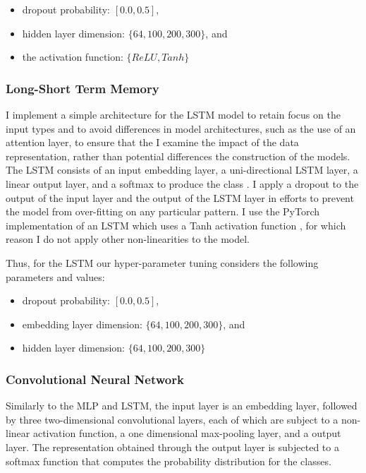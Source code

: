 \begin{itemize}  
  \item dropout probability: $[0.0, 0.5]$,  
  \item hidden layer dimension: $\{64, 100, 200, 300\}$, and  
  \item the activation function: $\{ReLU, Tanh\}$  
\end{itemize}  
  
\subsubsection{Long-Short Term Memory}  
I implement a simple architecture for the LSTM model to retain focus on the input types and to avoid differences in model architectures, such as the use of an attention layer, to ensure that the I examine the impact of the data representation, rather than potential differences the construction of the models.  
The LSTM consists of an input embedding layer, a uni-directional LSTM layer, a linear output layer, and a softmax to produce the class .  
I apply a dropout to the output of the input layer and the output of the LSTM layer in efforts to prevent the model from over-fitting on any particular pattern.  
I use the PyTorch implementation of an LSTM which uses a Tanh activation function \citep{Paszke:2019}, for which reason I do not apply other non-linearities to the model.  
  
Thus, for the LSTM our hyper-parameter tuning considers the following parameters and values:  
  
\begin{itemize}  
  \item dropout probability: $[0.0, 0.5]$,  
  \item embedding layer dimension: $\{64, 100, 200, 300\}$, and  
  \item hidden layer dimension: $\{64, 100, 200, 300\}$  
\end{itemize}  
  
\subsubsection{Convolutional Neural Network}  
Similarly to the MLP and LSTM, the input layer is an embedding layer, followed by three two-dimensional convolutional layers, each of which are subject to a non-linear activation function, a one dimensional max-pooling layer, and a output layer.  
The representation obtained through the output layer is subjected to a softmax function that computes the probability distribution for the classes.  
  
